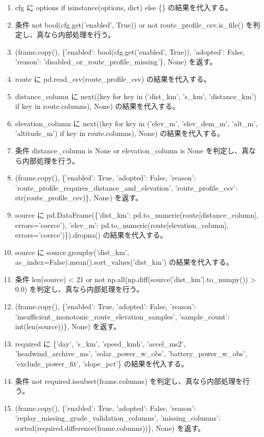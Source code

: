 \documentclass[a4paper,11pt]{article}
\begin{document}
            \begin{enumerate}[leftmargin=1.8em]
            \item cfg に options if isinstance(options, dict) else \{\} の結果を代入する。
\item 条件 not bool(cfg.get('enabled', True)) or not route\_profile\_csv.is\_file() を判定し、真なら内部処理を行う。
\item   (frame.copy(), \{'enabled': bool(cfg.get('enabled', True)), 'adopted': False, 'reason': 'disabled\_or\_route\_profile\_missing'\}, None) を返す。
\item route に pd.read\_csv(route\_profile\_csv) の結果を代入する。
\item distance\_column に next((key for key in ('dist\_km', 's\_km', 'distance\_km') if key in route.columns), None) の結果を代入する。
\item elevation\_column に next((key for key in ('elev\_m', 'elev\_dem\_m', 'alt\_m', 'altitude\_m') if key in route.columns), None) の結果を代入する。
\item 条件 distance\_column is None or elevation\_column is None を判定し、真なら内部処理を行う。
\item   (frame.copy(), \{'enabled': True, 'adopted': False, 'reason': 'route\_profile\_requires\_distance\_and\_elevation', 'route\_profile\_csv': str(route\_profile\_csv)\}, None) を返す。
\item source に pd.DataFrame(\{'dist\_km': pd.to\_numeric(route[distance\_column], errors='coerce'), 'elev\_m': pd.to\_numeric(route[elevation\_column], errors='coerce')\}).dropna() の結果を代入する。
\item source に source.groupby('dist\_km', as\_index=False).mean().sort\_values('dist\_km') の結果を代入する。
\item 条件 len(source) < 21 or not np.all(np.diff(source['dist\_km'].to\_numpy()) > 0.0) を判定し、真なら内部処理を行う。
\item   (frame.copy(), \{'enabled': True, 'adopted': False, 'reason': 'insufficient\_monotonic\_route\_elevation\_samples', 'sample\_count': int(len(source))\}, None) を返す。
\item required に \{'day', 's\_km', 'speed\_kmh', 'accel\_ms2', 'headwind\_archive\_ms', 'solar\_power\_w\_obs', 'battery\_power\_w\_obs', 'exclude\_power\_fit', 'slope\_pct'\} の結果を代入する。
\item 条件 not required.issubset(frame.columns) を判定し、真なら内部処理を行う。
\item   (frame.copy(), \{'enabled': True, 'adopted': False, 'reason': 'replay\_missing\_grade\_validation\_columns', 'missing\_columns': sorted(required.difference(frame.columns))\}, None) を返す。

\end{enumerate}
\end{document}
